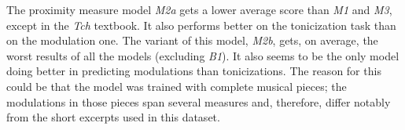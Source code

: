 \documentclass[sigconf]{acmart}
\begin{document}

The proximity measure model \emph{M2a} gets a lower average score than \emph{M1} and \emph{M3}, except in the \emph{Tch} textbook. 
It also performs better on the tonicization task than on the modulation one. 
The variant of this model, \emph{M2b}, gets, on average, the worst results of all the models (excluding \emph{B1}). It also seems to be the only model doing better in predicting modulations than tonicizations. 
The reason for this could be that the model was trained with complete musical pieces; the modulations in those pieces span several measures and, therefore, differ notably from the short excerpts used in this dataset.
\end{document}
